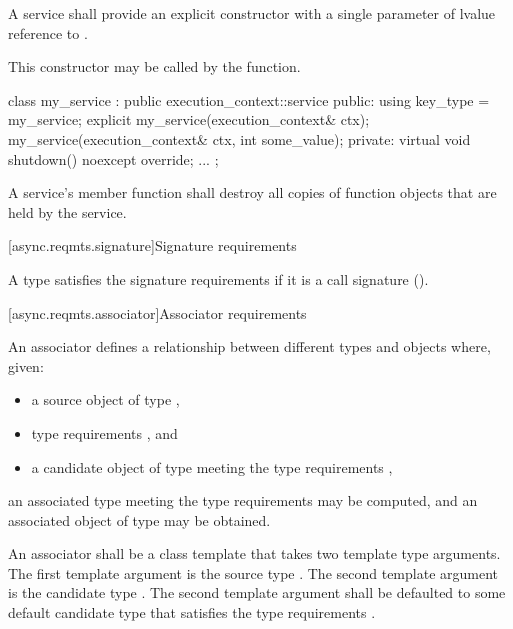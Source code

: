 \pnum
A service shall provide an explicit constructor with a single parameter of lvalue reference to . \begin{note} This constructor may be called by the  function. \end{note}

\pnum
\begin{example}

\begin{codeblock}
class my_service : public execution_context::service
{
public:
  using key_type = my_service;
  explicit my_service(execution_context& ctx);
  my_service(execution_context& ctx, int some_value);
private:
  virtual void shutdown() noexcept override;
  ...
};
\end{codeblock}

\end{example}

\pnum
A service's  member function shall destroy all copies of function objects that are held by the service.



[async.reqmts.signature]{Signature requirements}

%
%
\pnum
A type satisfies the signature requirements if it is a call signature ().



[async.reqmts.associator]{Associator requirements}

%
%
\pnum
An associator defines a relationship between different types and objects where, given:

\begin{itemize}
\item
a source object  of type ,

\item
type requirements , and

\item
a candidate object  of type  meeting the type requirements ,
\end{itemize}

an associated type  meeting the type requirements  may be computed, and an associated object  of type  may be obtained.

\pnum
An associator shall be a class template that takes two template type arguments. The first template argument is the source type . The second template argument is the candidate type . The second template argument shall be defaulted to some default candidate type  that satisfies the type requirements .

